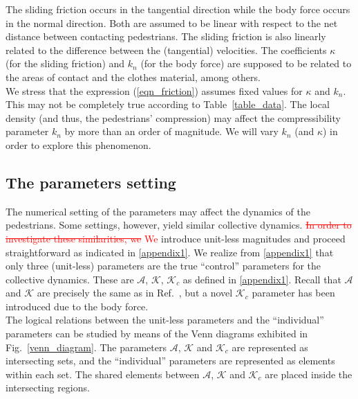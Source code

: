 \documentclass[preprint,12pt]{elsarticle}
\begin{document}
The sliding friction occurs in the tangential direction while the body force 
occurs in the normal direction. Both are assumed to be linear with respect to 
the net distance between contacting pedestrians. The sliding friction is also 
linearly related to the difference between the (tangential) velocities. The 
coefficients $\kappa$ (for the sliding friction) and $k_n$ (for the 
body force) are supposed to be related to the areas of contact and the clothes 
material, among others. \\

We stress that the expression (\ref{eqn_friction}) assumes fixed values for 
$\kappa$ and $k_n$. This may not be completely true according to 
Table~\ref{table_data}. The local density (and thus, the pedestrians' 
compression) may affect the compressibility parameter $k_n$ by more than an order 
of magnitude. We will vary $k_n$ (and $\kappa$) in order to explore this 
phenomenon. \\  


\subsection{\label{parameters}The parameters setting}

The numerical setting of the parameters may affect the dynamics of the 
pedestrians. Some settings, however, yield similar collective dynamics.
\textcolor{red}{\sout{In order to investigate these similarities, we} We}
 introduce unit-less magnitudes 
and proceed straightforward as indicated in \ref{appendix1}. We realize from 
\ref{appendix1} that only three (unit-less) parameters  are the true 
``control'' parameters for the collective dynamics. These are $\mathcal{A}$, 
$\mathcal{K}$, $\mathcal{K}_c$ as defined in \ref{appendix1}. Recall that 
$\mathcal{A}$ and $\mathcal{K}$ are precisely the same as in 
Ref.~\cite{dorso_2019}, but a novel $\mathcal{K}_c$ parameter has been 
introduced due to the body force.   \\

The logical relations between the unit-less parameters and the ``individual'' 
parameters can be studied by means of the Venn diagrams exhibited in 
Fig.~\ref{venn_diagram}. The parameters $\mathcal{A}$, $\mathcal{K}$ and 
$\mathcal{K}_c$ are represented as intersecting sets, and the ``individual'' 
parameters are represented as elements within each set. The shared elements 
between $\mathcal{A}$, $\mathcal{K}$ and $\mathcal{K}_c$ are placed inside the 
intersecting regions. \\
\end{document}
